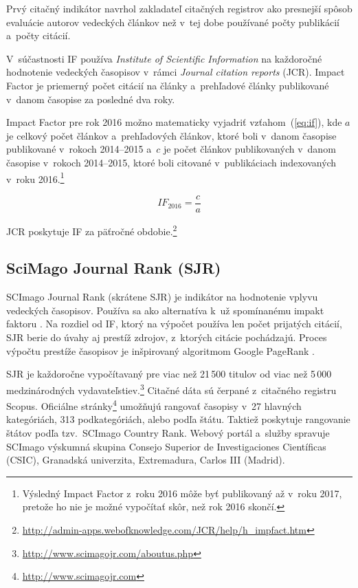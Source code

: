 Prvý citačný indikátor navrhol zakladateľ citačných registrov
\citet{Garfield1955} ako presnejší spôsob evaluácie autorov vedeckých článkov
než v~tej dobe používané počty publikácií a~počty citácií.

V~súčastnosti IF používa \emph{Institute of Scientific Information} na
každoročné hodnotenie vedeckých časopisov v~rámci \emph{Journal citation
  reports} (JCR).  Impact Factor je priemerný počet citácií na články
a~prehľadové články publikované v~danom časopise za posledné dva roky.

Impact Factor pre rok 2016 možno matematicky vyjadriť vzťahom~(\ref{eq:if}), kde
$a$ je celkový počet článkov a~prehľadových článkov, ktoré boli v~danom časopise
publikované v~rokoch 2014--2015 a~$c$ je počet článkov publikovaných v~danom
časopise v~rokoch 2014--2015, ktoré boli citované v~publikáciach indexovaných
v~roku 2016.\footnote{Výsledný Impact Factor z~roku 2016 môže byť publikovaný až
  v~roku 2017, pretože ho nie je možné vypočítať skôr, než rok 2016 skončí.}

\begin{equation}
\label{eq:if}
\mathit{IF}_{2016} = \frac{c}{a}
\end{equation}

\noindent JCR poskytuje IF za päťročné obdobie.\footnote{\url{http://admin-apps.webofknowledge.com/JCR/help/h_impfact.htm}}

\subsection{SciMago Journal Rank (SJR)}
\label{sec:sjr}

SCImago Journal Rank (skrátene SJR) je indikátor na hodnotenie vplyvu vedeckých
časopisov.  Používa sa ako alternatíva k~už spomínanému impakt faktoru
\citep{Falagas2008}.  Na rozdiel od IF, ktorý na výpočet používa len počet
prijatých citácií, SJR berie do úvahy aj prestíž zdrojov, z~ktorých citácie
pochádzajú.  Proces výpočtu prestíže časopisov \citep{GuerreroBote2012} je
inšpirovaný algoritmom Google PageRank\texttrademark{} \citep{Page1999}.

SJR je každoročne vypočítavaný pre viac než 21\,500 titulov od viac než 5\,000
medzinárodných
vydavateľstiev.\footnote{\url{http://www.scimagojr.com/aboutus.php}} Citačné
dáta sú čerpané z~citačného registru Scopus\textsuperscript{\textregistered}.
Oficiálne stránky\footnote{\url{http://www.scimagojr.com}} umožňujú rangovať
časopisy v~27 hlavných kategóriách, 313 podkategóriách, alebo podľa štátu.
Taktiež poskytuje rangovanie štátov podľa tzv.~SCImago Country Rank.  Webový
portál a~služby spravuje SCImago výskumná skupina Consejo Superior de
Investigaciones Científicas (CSIC), Granadská univerzita, Extremadura, Carlos
III (Madrid).


